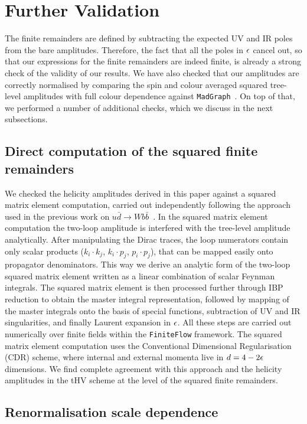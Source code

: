 \documentclass[main.tex]{subfiles}
\begin{document}
\section{Further Validation}
\label{Hbbsec:validation}

The finite remainders are defined by subtracting the expected UV and IR poles from the bare amplitudes. Therefore, the fact that all the poles in $\epsilon$ cancel out, so that our expressions for the finite remainders are indeed finite, is already a strong check of the validity of our results. We have also checked that our amplitudes are correctly normalised by comparing the spin and colour averaged squared tree-level amplitudes with full colour dependence against \texttt{MadGraph}~\cite{Alwall:2014hca}.
On top of that, we performed a number of additional checks, which we discuss in the next subsections.


\subsection{Direct computation of the squared finite remainders} 

We checked the helicity amplitudes derived in this paper against a squared matrix element computation, carried out independently following the approach used in the previous work on $u\bar{d}\to Wb\bar{b}$~\cite{Badger:2021nhg}.
In the squared matrix element computation the two-loop amplitude is interfered with the tree-level amplitude analytically. After manipulating the
Dirac traces, the loop numerators contain only scalar products ($k_i \cdot k_j$, $k_i \cdot p_j$, $p_i \cdot p_j$), that can be mapped easily onto propagator denominators. This way we derive an analytic form of the two-loop squared matrix element written as a linear combination of scalar Feynman integrals. The squared matrix element is then processed further through IBP reduction to obtain the master integral representation, followed by mapping of the master integrals onto the basis of special functions, subtraction of UV and IR singularities, and finally Laurent expansion in $\epsilon$. 
All these steps are carried out numerically over finite fields within the \texttt{FiniteFlow} framework. 
The squared matrix element computation uses the Conventional Dimensional Regularisation (CDR) scheme, where internal and external momenta live in $d=4-2 \epsilon$ dimensions. We find complete agreement with this approach and the helicity amplitudes in the tHV scheme at the level of the squared finite remainders.


\subsection{Renormalisation scale dependence}
\end{document}
